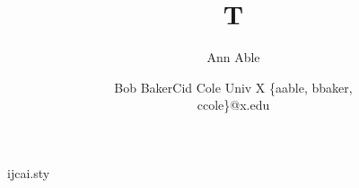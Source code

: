 \begin{filecontents*}[overwrite]{ijcai.sty}
\def\maketitle{\par\begingroup\@maketitle\endgroup
  \let\maketitle\relax \let\@maketitle\relax
  \gdef\@author{}\gdef\@title{}}
\def\@maketitle{\vbox{\centering{\LARGE\bf \@title \par}\vskip 0.2in
  {\def\and{\unskip\thinspace{\rm ,}\enspace}%
   \def\And{\unskip\enspace{\rm and}\enspace}%
   \def\affiliations{\egroup\par\bgroup\rm}%
   \def\emails{\egroup\par\bgroup\rm}%
   \bgroup\bf\@author\egroup}}}
\end{filecontents*}
\documentclass{article}
\usepackage{ijcai}
\title{T}
\author{Ann Able\and Bob Baker\And Cid Cole
\affiliations Univ X
\emails \{aable, bbaker,\\ ccole\}@x.edu}

\maketitle

